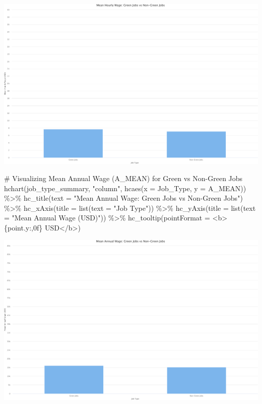 \documentclass[
  letterpaper,
  DIV=11,
  numbers=noendperiod]{scrartcl}
\newenvironment{Shaded}{\begin{snugshade}}{\end{snugshade}}
\newcommand{\AttributeTok}[1]{\textcolor[rgb]{0.40,0.45,0.13}{#1}}
\newcommand{\CommentTok}[1]{\textcolor[rgb]{0.37,0.37,0.37}{#1}}
\newcommand{\FunctionTok}[1]{\textcolor[rgb]{0.28,0.35,0.67}{#1}}
\newcommand{\NormalTok}[1]{\textcolor[rgb]{0.00,0.23,0.31}{#1}}
\newcommand{\SpecialCharTok}[1]{\textcolor[rgb]{0.37,0.37,0.37}{#1}}
\newcommand{\StringTok}[1]{\textcolor[rgb]{0.13,0.47,0.30}{#1}}
\begin{document}
\includegraphics{index_files/figure-pdf/unnamed-chunk-14-1.pdf}

\begin{Shaded}
\begin{Highlighting}[]
\CommentTok{\# Visualizing Mean Annual Wage (A\_MEAN) for Green vs Non{-}Green Jobs}
\FunctionTok{hchart}\NormalTok{(job\_type\_summary, }\StringTok{"column"}\NormalTok{, }\FunctionTok{hcaes}\NormalTok{(}\AttributeTok{x =}\NormalTok{ Job\_Type, }\AttributeTok{y =}\NormalTok{ A\_MEAN)) }\SpecialCharTok{\%\textgreater{}\%}
  \FunctionTok{hc\_title}\NormalTok{(}\AttributeTok{text =} \StringTok{"Mean Annual Wage: Green Jobs vs Non{-}Green Jobs"}\NormalTok{) }\SpecialCharTok{\%\textgreater{}\%}
  \FunctionTok{hc\_xAxis}\NormalTok{(}\AttributeTok{title =} \FunctionTok{list}\NormalTok{(}\AttributeTok{text =} \StringTok{"Job Type"}\NormalTok{)) }\SpecialCharTok{\%\textgreater{}\%}
  \FunctionTok{hc\_yAxis}\NormalTok{(}\AttributeTok{title =} \FunctionTok{list}\NormalTok{(}\AttributeTok{text =} \StringTok{"Mean Annual Wage (USD)"}\NormalTok{)) }\SpecialCharTok{\%\textgreater{}\%}
  \FunctionTok{hc\_tooltip}\NormalTok{(}\AttributeTok{pointFormat =} \StringTok{\textquotesingle{}\textless{}b\textgreater{}\{point.y:,0f\} USD\textless{}/b\textgreater{}\textquotesingle{}}\NormalTok{)}
\end{Highlighting}
\end{Shaded}

\includegraphics{index_files/figure-pdf/unnamed-chunk-14-2.pdf}
\end{document}
